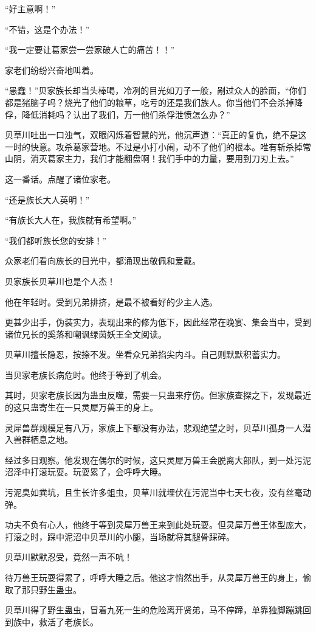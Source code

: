 \begin{this_body}
“好主意啊！”

“不错，这是个办法！”

“我一定要让葛家尝一尝家破人亡的痛苦！！”

家老们纷纷兴奋地叫着。

“愚蠢！”贝家族长却当头棒喝，冷冽的目光如刀子一般，剐过众人的脸面，“你们都是猪脑子吗？烧光了他们的粮草，吃亏的还是我们族人。你当他们不会杀掉降俘，降低消耗吗？认出了我们，万一他们杀俘泄愤怎么办？”

贝草川吐出一口浊气，双眼闪烁着智慧的光，他沉声道：“真正的复仇，绝不是这一时的快意。攻杀葛家营地。不过是小打小闹，动不了他们的根本。唯有斩杀掉常山阴，消灭葛家主力，我们才能翻盘啊！我们手中的力量，要用到刀刃上去。”

这一番话。点醒了诸位家老。

“还是族长大人英明！”

“有族长大人在，我族就有希望啊。”

“我们都听族长您的安排！”

众家老们看向族长的目光中，都涌现出敬佩和爱戴。

贝家族长贝草川也是个人杰！

他在年轻时。受到兄弟排挤，是最不被看好的少主人选。

更甚少出手，伪装实力，表现出来的修为低下，因此经常在晚宴、集会当中，受到诸位兄长的奚落和嘲讽绿茵妖王全文阅读。

贝草川擅长隐忍，按捺不发。坐看众兄弟掐尖内斗。自己则默默积蓄实力。

当贝家老族长病危时。他终于等到了机会。

其时，贝家老族长因为蛊虫反噬，需要一只蛊来疗伤。但家族查探之下，发现最近的这只蛊寄生在一只灵犀万兽王的身上。

灵犀兽群规模足有八万，家族上下都没有办法，悲观绝望之时，贝草川孤身一人潜入兽群栖息之地。

经过多日观察。他发现在偶尔的时候，这只灵犀万兽王会脱离大部队，到一处污泥沼泽中打滚玩耍。玩耍累了，会呼呼大睡。

污泥臭如粪坑，且生长许多蛆虫，贝草川就埋伏在污泥当中七天七夜，没有丝毫动弹。

功夫不负有心人，他终于等到灵犀万兽王来到此处玩耍。但灵犀万兽王体型庞大，打滚之时，踩中泥沼中贝草川的小腿，当场就将其腿骨踩碎。

贝草川默默忍受，竟然一声不吭！

待万兽王玩耍得累了，呼呼大睡之后。他这才悄然出手，从灵犀万兽王的身上，偷取了那只野生蛊虫。

贝草川得了野生蛊虫，冒着九死一生的危险离开贤弟，马不停蹄，单靠独脚蹦跳回到族中，救活了老族长。


\end{this_body}
